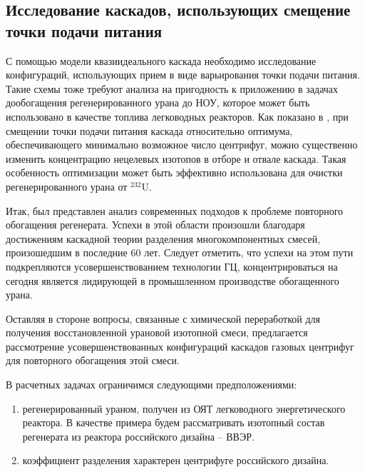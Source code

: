 \subsection{Исследование каскадов, использующих смещение точки подачи питания}
С помощью модели квазиидеального каскада необходимо исследование конфигураций, использующих прием в виде варьирования точки подачи питания. Такие схемы тоже требуют анализа на пригодность к приложению в задачах дообогащения регенерированного урана до НОУ, которое может быть использовано в качестве топлива легководных реакторов. Как показано в \cite{palk_2013}, при смещении точки подачи питания каскада относительно оптимума, обеспечивающего минимально возможное число центрифуг, можно существенно изменить концентрацию нецелевых изотопов в отборе и отвале каскада. Такая особенность оптимизации может быть эффективно использована для очистки регенерированного урана от $^{232}$U.



Итак, был представлен анализ современных подходов к проблеме повторного обогащения регенерата. Успехи в этой области произошли благодаря достижениям каскадной теории разделения многокомпонентных смесей, произошедшим в последние 60 лет. Следует отметить, что успехи на этом пути подкрепляются усовершенствованием технологии ГЦ, концентрироваться на сегодня является лидирующей в промышленном производстве обогащенного урана.

Оставляя в стороне вопросы, связанные с химической переработкой для получения восстановленной урановой изотопной смеси, предлагается рассмотрение усовершенствованных конфигураций каскадов газовых центрифуг для повторного обогащения этой смеси. 

В расчетных задачах ограничимся следующими предположениями:

 \begin{enumerate}
  \item регенерированный ураном, получен из ОЯТ легководного энергетического реактора. В качестве примера будем рассматривать изотопный состав регенерата из реактора российского дизайна -- ВВЭР.
  \item коэффициент разделения характерен центрифуге российского дизайна.
\end{enumerate}